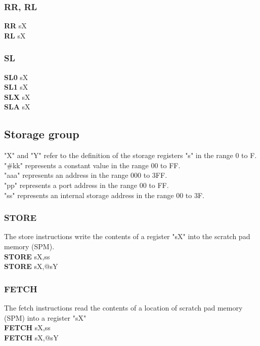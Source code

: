             \subsubsection{RR, RL}
                \textbf{RR}  sX\\
                \textbf{RL}  sX\\
            \subsubsection{SL}
                \textbf{SL0} sX\\
                \textbf{SL1} sX\\
                \textbf{SLX} sX\\
                \textbf{SLA} sX\\

        \subsection{Storage group}
            "X" and "Y" refer to the definition of the storage registers "s" in the range 0 to F.\\
            "\#kk" represents a constant value in the range 00 to FF.\\
            "aaa" represents an address in the range 000 to 3FF.\\
            "pp" represents a port address in the range 00 to FF.\\
            "ss" represents an internal storage address in the range 00 to 3F.\\

        \subsubsection{STORE}
            The store instructions write the contents of a register "sX" into the scratch pad memory (SPM).\\
                \textbf{STORE} sX,ss\\
                \textbf{STORE} sX,@sY\\

        \subsubsection{FETCH}
            The fetch instructions read the contents of a location of scratch pad memory (SPM) into a register "sX"\\
                \textbf{FETCH} sX,ss\\
                \textbf{FETCH} sX,@sY\\

